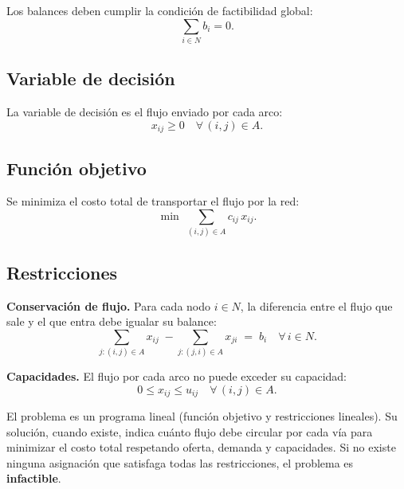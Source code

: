 \documentclass{article}
\begin{document}
Los balances deben cumplir la condición de factibilidad global:
\begin{equation}
    \sum_{i \in N} b_i = 0 .
\end{equation}

\subsection{Variable de decisión}

La variable de decisión es el flujo enviado por cada arco:
\begin{equation}
    x_{ij} \ge 0 \quad \forall\, (i,j) \in A .
\end{equation}

\subsection{Función objetivo}

Se minimiza el costo total de transportar el flujo por la red:
\begin{equation}
    \min \; \sum_{(i,j) \in A} c_{ij} \, x_{ij} .
\end{equation}

\subsection{Restricciones}

\textbf{Conservación de flujo.} Para cada nodo $i \in N$, la diferencia entre
el flujo que sale y el que entra debe igualar su balance:
\begin{equation}
    \sum_{j : (i,j) \in A} x_{ij} \; - \sum_{j : (j,i) \in A} x_{ji} \;=\; b_i
    \quad \forall\, i \in N .
\end{equation}

\textbf{Capacidades.} El flujo por cada arco no puede exceder su capacidad:
\begin{equation}
    0 \le x_{ij} \le u_{ij} \quad \forall\, (i,j) \in A .
\end{equation}

El problema es un programa lineal (función objetivo y restricciones lineales).
Su solución, cuando existe, indica cuánto flujo debe circular por cada vía para
minimizar el costo total respetando oferta, demanda y capacidades. Si no existe
ninguna asignación que satisfaga todas las restricciones, el problema es
\textbf{infactible}.

\end{document}
